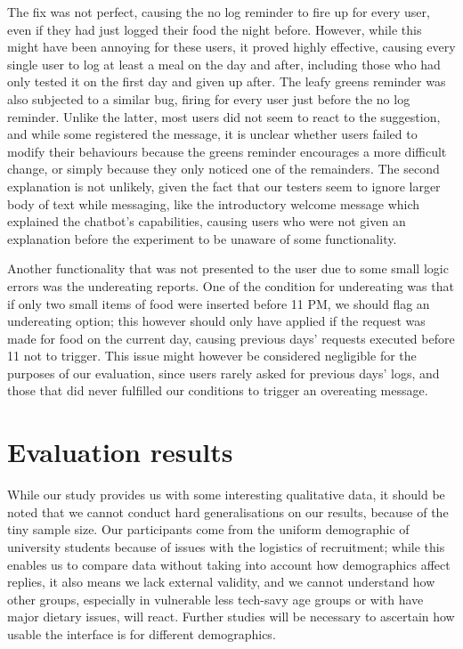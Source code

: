 The fix was not perfect, causing the no log reminder to fire up for every user, even if they had just logged their food the night before. However, while this might have been annoying for these users, it proved highly effective, causing every single user to log at least a meal on the day and after, including those who had only tested it on the first day and given up after. The leafy greens reminder was also subjected to a similar bug, firing for every user just before the no log reminder. Unlike the latter, most users did not seem to react to the suggestion, and while some registered the message, it is unclear whether users failed to modify their behaviours because the greens reminder encourages a more difficult change, or simply because they only noticed one of the remainders. The second explanation is not unlikely, given the fact that our testers seem to ignore larger body of text while messaging, like the introductory welcome message which explained the chatbot's capabilities, causing users who were not given an explanation before the experiment to be unaware of some functionality. 

Another functionality that was not presented to the user due to some small logic errors was the undereating reports. One of the condition for undereating was that if only two small items of food were inserted before 11 PM, we should flag an undereating option; this however should only have applied if the request was made for food on the current day, causing previous days' requests executed before 11 not to trigger. This issue might however be considered negligible for the purposes of our evaluation, since users rarely asked for previous days' logs, and those that did never fulfilled our conditions to trigger an overeating message.
\section{Evaluation results}
While our study provides us with some interesting qualitative data, it should be noted that we cannot conduct hard generalisations on our results, because of the tiny sample size. Our participants come from the uniform demographic of university students because of issues with the logistics of recruitment; while this enables us to compare data without taking into account how demographics affect replies, it also means we lack external validity, and we cannot understand how other groups, especially in vulnerable less tech-savy age groups or with have major dietary issues, will react. Further studies will be necessary to ascertain how usable the interface is for different demographics. 


